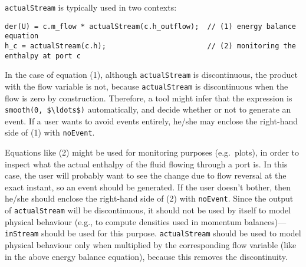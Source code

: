 \begin{nonnormative}
\lstinline!actualStream! is typically used in two contexts:
\begin{lstlisting}[language=modelica]
der(U) = c.m_flow * actualStream(c.h_outflow);  // (1) energy balance equation
h_c = actualStream(c.h);                        // (2) monitoring the enthalpy at port c
\end{lstlisting}
In the case of equation (1), although \lstinline!actualStream!
is discontinuous, the product with the flow variable is not, because
\lstinline!actualStream! is discontinuous when the flow is zero by construction.
Therefore, a tool might infer that the expression is \lstinline!smooth(0, $\ldots$)!
automatically, and decide whether or not to generate an event. If a user
wants to avoid events entirely, he/she may enclose the right-hand side
of (1) with \lstinline!noEvent!.

Equations like (2) might be used for monitoring purposes (e.g.\ plots), in order to inspect what the actual enthalpy of the fluid flowing through a port is.
In this case, the user will probably want to see the change due to flow reversal at the exact instant, so an event should be generated.  If the user doesn't
bother, then he/she should enclose the right-hand side of (2) with \lstinline!noEvent!.  Since the output of \lstinline!actualStream! will be discontinuous,
it should not be used by itself to model physical behaviour (e.g., to compute densities used in momentum balances)---\lstinline!inStream! should be used
for this purpose.  \lstinline!actualStream! should be used to model physical behaviour only when multiplied by the corresponding flow variable (like in the
above energy balance equation), because this removes the discontinuity.
\end{nonnormative}
